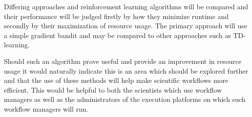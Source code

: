 Differing approaches and reinforcement learning algorithms will be compared and their performance will be judged firstly by how they minimize runtime and secondly by their maximization of resource usage. The primary approach will use a simple gradient bandit and may be compared to other approaches such as TD-learning.

Should such an algorithm prove useful and provide an improvement in resource usage it would naturally indicate this is an area which should be explored further and that the use of these methods will help make scientific workflows more efficient. This would be helpful to both the scientists which use workflow managers as well as the administrators of the execution platforms on which such workflow managers will run.



